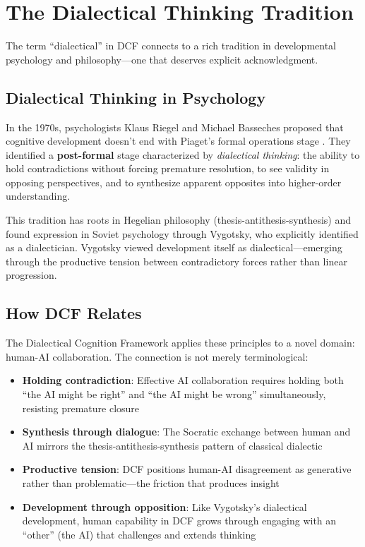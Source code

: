 \chapter{The Dialectical Thinking Tradition}

The term ``dialectical'' in DCF connects to a rich tradition in developmental psychology and philosophy---one that deserves explicit acknowledgment.

\section{Dialectical Thinking in Psychology}

In the 1970s, psychologists Klaus Riegel and Michael Basseches proposed that cognitive development doesn't end with Piaget's formal operations stage \cite{riegel1973dialectical, basseches1984dialectical}. They identified a \textbf{post-formal} stage characterized by \emph{dialectical thinking}: the ability to hold contradictions without forcing premature resolution, to see validity in opposing perspectives, and to synthesize apparent opposites into higher-order understanding.

This tradition has roots in Hegelian philosophy (thesis-antithesis-synthesis) and found expression in Soviet psychology through Vygotsky, who explicitly identified as a dialectician. Vygotsky viewed development itself as dialectical---emerging through the productive tension between contradictory forces rather than linear progression.

\section{How DCF Relates}

The Dialectical Cognition Framework applies these principles to a novel domain: human-AI collaboration. The connection is not merely terminological:

\begin{itemize}
    \item \textbf{Holding contradiction}: Effective AI collaboration requires holding both ``the AI might be right'' and ``the AI might be wrong'' simultaneously, resisting premature closure
    \item \textbf{Synthesis through dialogue}: The Socratic exchange between human and AI mirrors the thesis-antithesis-synthesis pattern of classical dialectic
    \item \textbf{Productive tension}: DCF positions human-AI disagreement as generative rather than problematic---the friction that produces insight
    \item \textbf{Development through opposition}: Like Vygotsky's dialectical development, human capability in DCF grows through engaging with an ``other'' (the AI) that challenges and extends thinking
\end{itemize}

